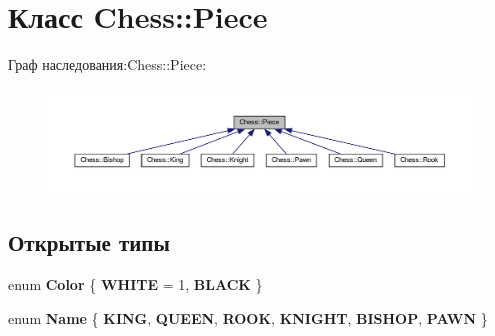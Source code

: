 \hypertarget{class_chess_1_1_piece}{}\section{Класс Chess\+:\+:Piece}
\label{class_chess_1_1_piece}


Граф наследования\+:Chess\+:\+:Piece\+:\nopagebreak
\begin{figure}[H]
\begin{center}
\leavevmode
\includegraphics[width=350pt]{class_chess_1_1_piece__inherit__graph}
\end{center}
\end{figure}
\subsection*{Открытые типы}
\begin{DoxyCompactItemize}
\item 
\mbox{\label{class_chess_1_1_piece_a65c480b6cb99b4e3732d6c14cf5f75e5}} 
enum {\bfseries Color} \{ {\bfseries W\+H\+I\+TE} = 1, 
{\bfseries B\+L\+A\+CK}
 \}
\item 
\mbox{\label{class_chess_1_1_piece_a691ee828590a8fe4a5aacc8669ed63c4}} 
enum {\bfseries Name} \{ \newline
{\bfseries K\+I\+NG}, 
{\bfseries Q\+U\+E\+EN}, 
{\bfseries R\+O\+OK}, 
{\bfseries K\+N\+I\+G\+HT}, 
\newline
{\bfseries B\+I\+S\+H\+OP}, 
{\bfseries P\+A\+WN}
 \}
\end{DoxyCompactItemize}
